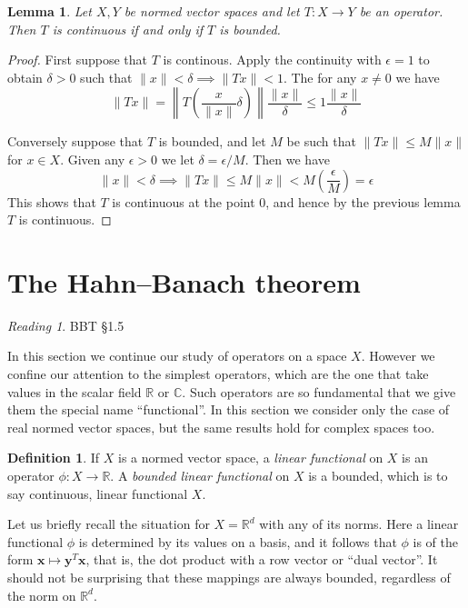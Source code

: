 \documentclass[11pt,oneside]{amsbook}
\newcommand{\RR}{{\mathbb R}}
\newcommand{\CC}{{\mathbb C}}
\theoremstyle{definition}
\theoremstyle{plain}
\newtheorem{lem}[thm]{Lemma}
\theoremstyle{definition}
\newtheorem{defn}[thm]{Definition}
\theoremstyle{remark}
\newtheorem*{reading}{Reading}
\numberwithin{equation}{section}
\numberwithin{figure}{section}
\begin{document}
\begin{lem}
  Let $X,Y$ be normed vector spaces and let $T\colon X\to Y$ be an operator. Then $T$ is continuous if and only if $T$ is bounded.
\end{lem}

\begin{proof}
  First suppose that $T$ is continous. Apply the continuity with $\epsilon=1$ to obtain $\delta>0$ such that $\|x\|<\delta\implies\|Tx\|<1$. The for any $x\neq0$ we have
  \[\|Tx\|=\left\|T\left(\frac{x}{\|x\|}\delta\right)\right\|\frac{\|x\|}{\delta}\leq 1\frac{\|x\|}{\delta}
  \]

  Conversely suppose that $T$ is bounded, and let $M$ be such that $\|Tx\|\leq M\|x\|$ for $x\in X$. Given any $\epsilon>0$ we let $\delta=\epsilon/M$. Then we have
  \[\|x\|<\delta\implies\|Tx\|\leq M\|x\|<M\left(\frac{\epsilon}{M}\right)=\epsilon
  \]
  This shows that $T$ is continuous at the point $0$, and hence by the previous lemma $T$ is continuous.
\end{proof}

\newpage
\section{The Hahn--Banach theorem}

\begin{reading}
  BBT \S 1.5
\end{reading}

In this section we continue our study of operators on a space $X$. However we confine our attention to the simplest operators, which are the one that take values in the scalar field $\RR$ or $\CC$. Such operators are so fundamental that we give them the special name ``functional''. In this section we consider only the case of real normed vector spaces, but the same results hold for complex spaces too.

\begin{defn}
  If $X$ is a normed vector space, a \emph{linear functional} on $X$ is an operator $\phi\colon X\to\RR$. A \emph{bounded linear functional} on $X$ is a bounded, which is to say continuous, linear functional $X$.
\end{defn}

Let us briefly recall the situation for $X=\RR^d$ with any of its norms. Here a linear functional $\phi$ is determined by its values on a basis, and it follows that $\phi$ is of the form $\mathbf{x}\mapsto\mathbf{y}^T\mathbf{x}$, that is, the dot product with a row vector or ``dual vector''. It should not be surprising that these mappings are always bounded, regardless of the norm on $\RR^d$.
\end{document}
